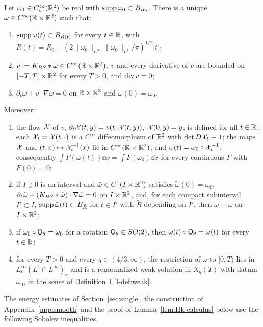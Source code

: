 \begin{theorem}
\label{thm:smooth}
Let $\omega_0\in C_c^\infty(\mathbb{R}^2)$ be real with $\operatorname{supp}\omega_0\subset B_{R_0}$.
There is a unique $\omega\in C^\infty(\mathbb{R}\times\mathbb{R}^2)$ such that:
\begin{enumerate}[label=\textup{(\arabic*)}]
\item $\operatorname{supp}\omega(t)\subset B_{R(t)}$ for every $t\in\mathbb{R}$, with
  $R(t)=R_0+(2\|\omega_0\|_{L^\infty}\|\omega_0\|_{L^1}/\pi)^{1/2}|t|$;
\item $v:=K_{BS}\ast\omega\in C^\infty(\mathbb{R}\times\mathbb{R}^2)$, $v$ and every derivative of
  $v$ are bounded on $[-T,T]\times\mathbb{R}^2$ for every $T>0$, and $\operatorname{div} v=0$;
\item $\partial_t\omega+v\cdot\nabla\omega=0$ on $\mathbb{R}\times\mathbb{R}^2$ and $\omega(0)=\omega_0$.
\end{enumerate}
Moreover:
\begin{enumerate}[label=\textup{(\arabic*)},resume]
\item the flow $\mathcal{X}$ of $v$, $\partial_t\mathcal{X}(t,y)=v(t,\mathcal{X}(t,y))$,
  $\mathcal{X}(0,y)=y$, is defined for all $t\in\mathbb{R}$; each $\mathcal{X}_t=\mathcal{X}(t,\cdot)$ is
  a $C^\infty$ diffeomorphism of $\mathbb{R}^2$ with $\det D\mathcal{X}_t\equiv1$; the maps
  $\mathcal{X}$ and $(t,x)\mapsto\mathcal{X}_t^{-1}(x)$ lie in $C^\infty(\mathbb{R}\times\mathbb{R}^2)$; and
  $\omega(t)=\omega_0\circ\mathcal{X}_t^{-1}$; consequently
  $\int F(\omega(t))\dd x=\int F(\omega_0)\dd x$ for every continuous $F$ with
  $F(0)=0$;
\item if $I\ni0$ is an interval and $\tilde\omega\in C^1(I\times\mathbb{R}^2)$ satisfies
  $\tilde\omega(0)=\omega_0$, $\partial_t\tilde\omega+(K_{BS}\ast\tilde\omega)\cdot\nabla\tilde\omega=0$
  on $I\times\mathbb{R}^2$, and, for each compact subinterval $I'\subset I$,
  $\operatorname{supp}\tilde\omega(t)\subset B_{\tilde R}$ for $t\in I'$ with $\tilde R$
  depending on $I'$, then $\tilde\omega=\omega$ on $I\times\mathbb{R}^2$;
\item if $\omega_0\circ\mathsf{O}_\theta=\omega_0$ for a rotation $\mathsf{O}_\theta\in SO(2)$,
  then $\omega(t)\circ\mathsf{O}_\theta=\omega(t)$ for every $t\in\mathbb{R}$;
\item for every $T>0$ and every $q\in(4/3,\infty)$, the restriction of $\omega$
  to $[0,T)$ lies in $L^\infty_t(L^1\cap L^\infty)_x$ and is a renormalized
  weak solution in $X_q(T)$ with datum $\omega_0$, in the sense of
  Definition~I.\ref{I-def:weak}.
\end{enumerate}
\end{theorem}

The energy estimates of Section~\ref{sec:single}, the construction of
Appendix~\ref{app:smooth} and the proof of Lemma~\ref{lem:Hk-calculus} below use
the following Sobolev inequalities.

